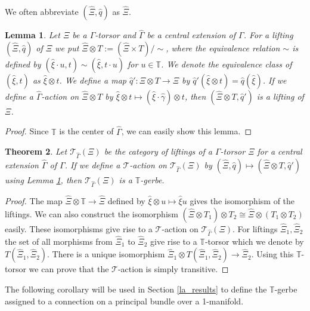 \documentclass[a4paper,a4paper]{article}
\newtheorem{thm}{Theorem}[section]
\newtheorem{lem}[thm]{Lemma}
\theoremstyle{definition}
\theoremstyle{remark}
\newcommand{\T}{\mathbb{T}}
\newcommand{\sT}{\mathcal{T}}
\newcommand{\hq}{\widehat{q}}
\def\h#1{ \widehat{#1} }
\begin{document}
We often abbreviate $(\h{\Xi}, \hq)$ as $\h{\Xi}$.

\begin{lem} \label{lem_dfn_sTaction}
Let $\Xi$ be a $\Gamma$-torsor and $\h{\Gamma}$ be a central extension of $\Gamma$. For a lifting $(\h{\Xi}, \hq)$ of $\Xi$ we put $\h{\Xi} \otimes T := (\h{\Xi} \times T)/\sim$, where the equivalence relation $\sim$ is defined by $(\h{\xi} \cdot u, t) \sim (\h{\xi}, t \cdot u)$ for $u \in \T$. We denote the equivalence class of $(\h{\xi}, t)$ as $\h{\xi} \otimes t$. We define a map $\hq' : \h{\Xi} \otimes T \to \Xi$ by $\hq'(\h{\xi} \otimes t) = \hq(\h{\xi})$. If we define a $\h{\Gamma}$-action on $\h{\Xi} \otimes T$ by $\h{\xi} \otimes t \mapsto (\h{\xi} \cdot \h{\gamma}) \otimes t$, then $(\h{\Xi} \otimes T, \hq')$ is a lifting of $\Xi$.
\end{lem}

\begin{proof}
Since $\T$ is the center of $\h{\Gamma}$, we can easily show this lemma.
\end{proof}

\begin{thm}
Let $\sT_{\h{\Gamma}}(\Xi)$ be the category of liftings of a $\Gamma$-torsor $\Xi$ for a central extension $\h{\Gamma}$ of $\Gamma$. If we define a $\sT$-action on $\sT_{\h{\Gamma}}(\Xi)$ by $(\h{\Xi}, \hq) \mapsto (\h{\Xi} \otimes T, \hq')$ using Lemma \ref{lem_dfn_sTaction}, then $\sT_{\h{\Gamma}}(\Xi)$ is a $\T$-gerbe.
\end{thm}

\begin{proof}
The map $\h{\Xi} \otimes \T \to \h{\Xi}$ defined by $\h{\xi} \otimes u \mapsto \h{\xi}u$ gives the isomorphism of the liftings. We can also construct the isomorphism $(\h{\Xi} \otimes T_1) \otimes T_2 \cong \h{\Xi} \otimes (T_1 \otimes T_2)$ easily. These isomorphisms give rise to a $\sT$-action on $\sT_{\h{\Gamma}}(\Xi)$. For liftings $\h{\Xi}_1, \h{\Xi}_2$ the set of all morphisms from $\h{\Xi}_1$ to $\h{\Xi}_2$ give rise to a $\T$-torsor which we denote by $T(\h{\Xi}_1, \h{\Xi}_2)$. There is a unique isomorphism $\h{\Xi}_1 \otimes T(\h{\Xi}_1, \h{\Xi}_2) \to \h{\Xi}_2$. Using this $\T$-torsor we can prove that the $\sT$-action is simply transitive.
\end{proof}

The following corollary will be used in Section \ref{la_results} to define the $\T$-gerbe assigned to a connection on a principal bundle over a 1-manifold.
\end{document}
